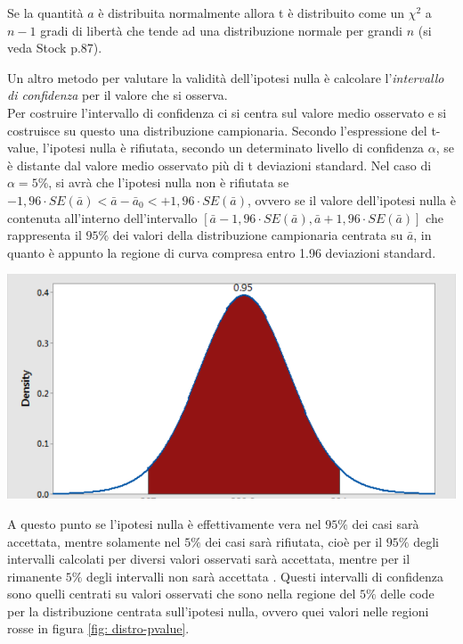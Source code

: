 \documentclass[]{article}
\begin{document}
Se la quantità $a$ è distribuita normalmente allora t è distribuito come un $\chi^2$ a $n-1$ gradi di libertà che tende ad una distribuzione normale per grandi $n$ (si veda Stock p.87).

\begin{tcolorbox}[colback=cyan!5!white, colframe=cyan!75!black, title= \textbf{Intervallo di confidenza}, sidebyside align=center, lower separated=false]
Un altro metodo per valutare la validità dell'ipotesi nulla è calcolare l'\textit{intervallo di confidenza} per il valore che si osserva.\\
Per costruire l'intervallo di confidenza ci si centra sul valore medio osservato e si costruisce su questo una distribuzione campionaria. Secondo l'espressione del t-value, l'ipotesi nulla è rifiutata, secondo un determinato livello di confidenza $\alpha$, se è distante dal valore medio osservato più di t deviazioni standard. Nel caso di $\alpha = 5\%$, si avrà che l'ipotesi nulla non è rifiutata se $-1,96 \cdot SE(\bar{a}) < \bar{a} - \bar{a}_0 < +1,96 \cdot SE(\bar{a})$, ovvero se il valore dell'ipotesi nulla è contenuta all'interno dell'intervallo $[\bar{a} - 1,96 \cdot SE(\bar{a}), \bar{a} + 1,96 \cdot SE(\bar{a})]$ che rappresenta il $95\%$ dei valori della distribuzione campionaria centrata su $\bar{a}$, in quanto è appunto la regione di curva compresa entro 1.96 deviazioni standard.
\begin{center}
\includegraphics[scale=0.3]{Immagini/intervallo-di-confidenza.png}
\end{center}
A questo punto se l'ipotesi nulla è effettivamente vera nel $95\%$ dei casi sarà accettata, mentre solamente nel $5\%$ dei casi sarà rifiutata, cioè per il $95\%$ degli intervalli calcolati per diversi valori osservati sarà accettata, mentre per il rimanente $5\%$ degli intervalli non sarà accettata . Questi intervalli di confidenza sono quelli centrati su valori osservati che sono nella regione del $5\%$ delle code per la distribuzione centrata sull'ipotesi nulla, ovvero quei valori nelle regioni rosse in figura \ref{fig: distro-pvalue}. 
\end{tcolorbox}
\end{document}
